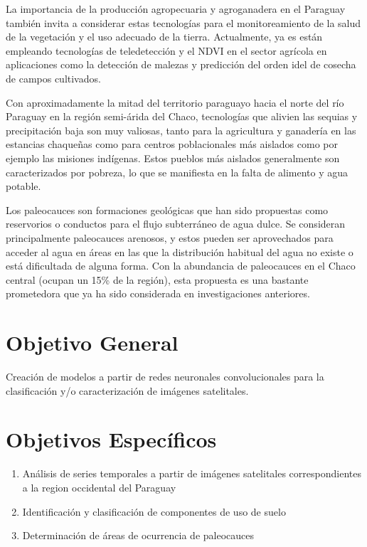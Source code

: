 \documentclass[a4paper, 11pt]{article}
\begin{document}
La importancia de la producción agropecuaria y agroganadera en el Paraguay también invita a considerar estas tecnologías para el monitoreamiento de la salud de la vegetación y el uso adecuado de la tierra. Actualmente, ya es están empleando tecnologías de teledetección y el NDVI en el sector agrícola en aplicaciones como la detección de malezas y predicción del orden idel de cosecha de campos cultivados. \autocite{onesoil-agricultura-paraguay}

Con aproximadamente la mitad del territorio paraguayo hacia el norte del río Paraguay en la región semi-árida del Chaco, tecnologías que alivien las sequias y precipitación baja son muy valiosas, tanto para la agricultura y ganadería en las estancias chaqueñas como para centros poblacionales más aislados como por ejemplo las misiones indígenas. Estos pueblos más aislados generalmente son caracterizados por pobreza, lo que se manifiesta en la falta de alimento y agua potable.

Los paleocauces son formaciones geológicas que han sido propuestas como reservorios o conductos para el flujo subterráneo de agua dulce. Se consideran principalmente paleocauces arenosos, y estos pueden ser aprovechados para acceder al agua en áreas en las que la distribución habitual del agua no existe o está dificultada de alguna forma. \autocite{wikipedia-paleochannel} Con la abundancia de paleocauces en el Chaco central (ocupan un 15\% de la región), esta propuesta es una bastante prometedora que ya ha sido considerada en investigaciones anteriores. \autocite{conacyt-sistemas-captacion-agua}

\section*{Objetivo General}
Creación de modelos a partir de redes neuronales convolucionales para la clasificación y/o caracterización de imágenes satelitales.

\section*{Objetivos Específicos}
\begin{enumerate}
    \item Análisis de series temporales a partir de imágenes satelitales correspondientes a la region occidental del Paraguay
    \item Identificación y clasificación de componentes de uso de suelo
    \item Determinación de áreas de ocurrencia de paleocauces
\end{enumerate}
\end{document}

